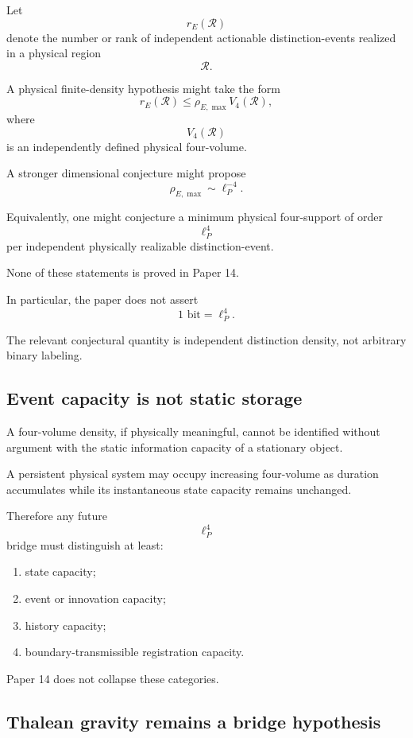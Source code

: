 Let
\[
r_E(\mathcal R)
\]
denote the number or rank of independent actionable distinction-events
realized in a physical region
\[
\mathcal R.
\]

A physical finite-density hypothesis might take the form
\[
r_E(\mathcal R)
\le
\rho_{E,\max}V_4(\mathcal R),
\]
where
\[
V_4(\mathcal R)
\]
is an independently defined physical four-volume.

A stronger dimensional conjecture might propose
\[
\rho_{E,\max}
\sim
\ell_P^{-4}.
\]

Equivalently, one might conjecture a minimum physical four-support of
order
\[
\ell_P^4
\]
per independent physically realizable distinction-event.

None of these statements is proved in Paper 14.

In particular, the paper does not assert
\[
1\text{ bit}=\ell_P^4.
\]

The relevant conjectural quantity is independent distinction density,
not arbitrary binary labeling.

\subsection{Event capacity is not static storage}

A four-volume density, if physically meaningful, cannot be identified
without argument with the static information capacity of a stationary
object.

A persistent physical system may occupy increasing four-volume as
duration accumulates while its instantaneous state capacity remains
unchanged.

Therefore any future
\[
\ell_P^4
\]
bridge must distinguish at least:

\begin{enumerate}[label=(\roman*)]

\item state capacity;

\item event or innovation capacity;

\item history capacity;

\item boundary-transmissible registration capacity.

\end{enumerate}

Paper 14 does not collapse these categories.

\subsection{Thalean gravity remains a bridge hypothesis}


